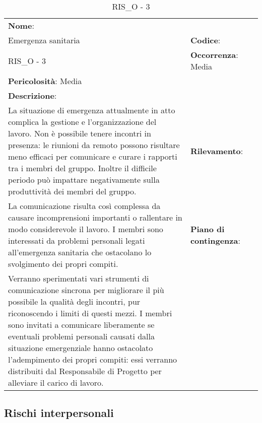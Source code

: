 \renewcommand{\arraystretch}{1.5}
\begin{longtable} { 
		>{\raggedright}p{} 
		>{\raggedright}p{} 
		>{\raggedright}p{}    }
	
	\caption{RIS\_O - 3} \endhead	
	
	
	\textbf{Nome}: \\ Emergenza sanitaria
	& \textbf{Codice}: \\ RIS\_O - 3
	& \textbf{Occorrenza}: Media \\ \textbf{Pericolosità}: Media
	
	\tabularnewline
	
	\textbf{Descrizione}: \\ La situazione di emergenza attualmente in atto complica la gestione e l'organizzazione del lavoro. Non è possibile tenere incontri in presenza: le riunioni da remoto possono risultare meno efficaci per comunicare e curare i rapporti tra i membri del gruppo. Inoltre il difficile periodo può impattare negativamente sulla produttività dei membri del gruppo.
	&
	\textbf{Rilevamento}: \\ La comunicazione risulta così complessa da causare incomprensioni importanti o rallentare in modo considerevole il lavoro. I membri sono interessati da problemi personali legati all'emergenza sanitaria che ostacolano lo svolgimento dei propri compiti.
	& 
	\textbf{Piano di contingenza}: \\ Verranno sperimentati vari strumenti di comunicazione sincrona per migliorare il più possibile la qualità degli incontri, pur riconoscendo i limiti di questi mezzi. I membri sono invitati a comunicare liberamente se eventuali problemi personali causati dalla situazione emergenziale hanno ostacolato l'adempimento dei propri compiti: essi verranno distribuiti dal Responsabile di Progetto per alleviare il carico di lavoro.

	
\end{longtable}



\subsection{Rischi interpersonali}



